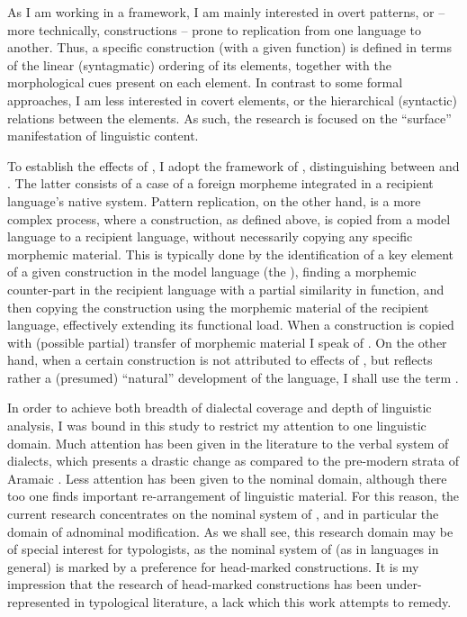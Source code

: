 As I am working in a  framework, I am mainly interested  in overt patterns, or -- more technically, constructions -- prone to replication from one language to another. Thus, a specific construction (with a given function)  is defined in terms of the linear (syntagmatic) ordering of its elements, together with the morphological cues present on each element.
In contrast to some formal approaches, I am less interested in covert elements, or the hierarchical (syntactic) relations between the elements. As such, the research is focused on the \enquote{surface} manifestation of linguistic content. 

To establish the effects of , I adopt the framework of \citet{MatrasSakel}, distinguishing between  and . The latter consists of a case of a foreign morpheme integrated in a recipient language's native system. Pattern replication, on the other hand, is a more complex process, where a construction, as defined above, is copied from a model language to a recipient language, without necessarily copying any specific morphemic material. This is typically done by the identification of a key element of a given construction in the model language (the ), finding a morphemic counter-part in the recipient language with a partial similarity in function, and then copying the construction using the morphemic material of the recipient language, effectively extending its functional load. When a construction is copied with (possible partial) transfer of morphemic material I speak of . On the other hand, when a certain construction is not attributed to effects of , but reflects rather a (presumed) \enquote{natural} development of the language, I shall use the term . 

In order to achieve both breadth of dialectal coverage and depth of linguistic analysis,
 I was bound in this study to restrict my attention to one linguistic domain. Much attention has been given in the literature to the verbal system of  dialects, which presents a drastic change as compared to the pre-modern strata of Aramaic \citep[see \textit{inter alia}][]{GoldenbergEarly, CoghillRise, GutmanReexamination}. Less attention has been given to the nominal domain, although there too one finds important re-arrangement of linguistic material. For this reason, the current research  concentrates on the nominal system of , and in particular the domain of adnominal modification. As we shall see, this research domain may be of special interest for typologists, as the nominal system of  (as in  languages in general) is marked by a preference for head-marked constructions. It is my impression that the research of head-marked constructions has been under-represented in typological literature, a lack which this work attempts to remedy.

